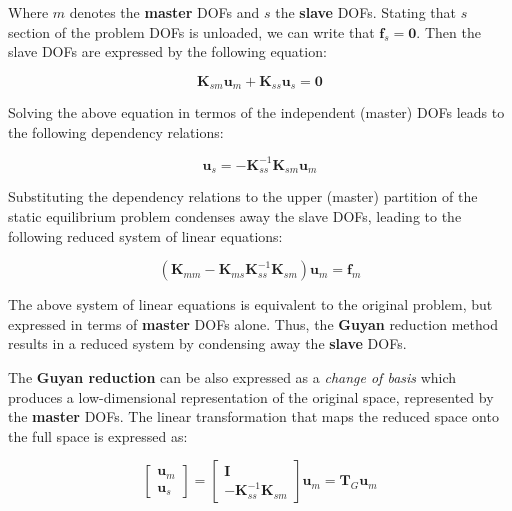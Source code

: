\documentclass[10pt,b5paper,titlepage]{book}
\begin{document}
Where $ m $ denotes the \textbf{master} DOFs and $ s $ the \textbf{slave} DOFs.
Stating that $ s $ section of the problem DOFs is unloaded, we can
write that $ \mathbf{f}_s = \mathbf{0} $. Then the slave DOFs are expressed
by the following equation:

\begin{equation}
    \mathbf{K}_{sm} \mathbf{u}_m + \mathbf{K}_{ss} \mathbf{u}_s = \mathbf{0}
\end{equation}

Solving the above equation in termos of the independent (master) DOFs leads to
the following dependency relations:

\begin{equation}
    \mathbf{u}_s = -\mathbf{K}_{ss}^{-1} \mathbf{K}_{sm} \mathbf{u}_m
\end{equation}

Substituting the dependency relations to the upper (master) partition of the static
equilibrium problem condenses away the slave DOFs, leading to the following reduced
system of linear equations:

\begin{equation}
    \left(\mathbf{K}_{mm} - \mathbf{K}_{ms} \mathbf{K}_{ss}^{-1} \mathbf{K}_{sm} \right)
    \mathbf{u}_m = \mathbf{f}_m
\end{equation}

The above system of linear equations is equivalent to the original problem, but expressed
in terms of \textbf{master} DOFs alone. Thus, the \textbf{Guyan} reduction method
results in a reduced system by condensing away the \textbf{slave} DOFs.

The \textbf{Guyan reduction} can be also expressed as a \textit{change of basis} which
produces a low-dimensional representation of the original space, represented by the
\textbf{master} DOFs. The linear transformation that maps the reduced space onto
the full space is expressed as:

\begin{equation}
    \begin{bmatrix}
        \mathbf{u}_m \\
        \mathbf{u}_s
    \end{bmatrix} =
    \begin{bmatrix}
        \mathbf{I} \\
        -\mathbf{K}_{ss}^{-1} \mathbf{K}_{sm}
    \end{bmatrix}
    \mathbf{u}_m = \mathbf{T}_G \mathbf{u}_m
\end{equation}
\end{document}
